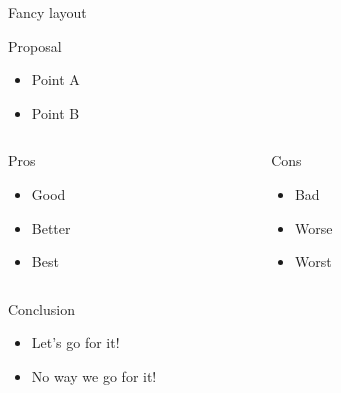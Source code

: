 \documentclass[
  11pt,
  ignorenonframetext,
  aspectratio=169,
  aspectratio=169]{beamer}
\providecommand{\tightlist}{%
  \setlength{\itemsep}{0pt}\setlength{\parskip}{0pt}}
\begin{document}
\begin{frame}{Fancy layout}
\protect\hypertarget{fancy-layout}{}
\begin{block}{Proposal}
\protect\hypertarget{proposal}{}
\begin{itemize}
\tightlist
\item
  Point A
\item
  Point B
\end{itemize}
\end{block}

\begin{columns}[T]
\begin{column}{0.48\textwidth}
\begin{block}{Pros}
\protect\hypertarget{pros}{}
\begin{itemize}
\tightlist
\item
  Good
\item
  Better
\item
  Best
\end{itemize}
\end{block}
\end{column}

\begin{column}{0.48\textwidth}
\begin{block}{Cons}
\protect\hypertarget{cons}{}
\begin{itemize}
\tightlist
\item
  Bad
\item
  Worse
\item
  Worst
\end{itemize}
\end{block}
\end{column}
\end{columns}

\begin{block}{Conclusion}
\protect\hypertarget{conclusion}{}
\begin{itemize}
\tightlist
\item
  Let's go for it!
\item
  No way we go for it!
\end{itemize}
\end{block}
\end{frame}
\end{document}
